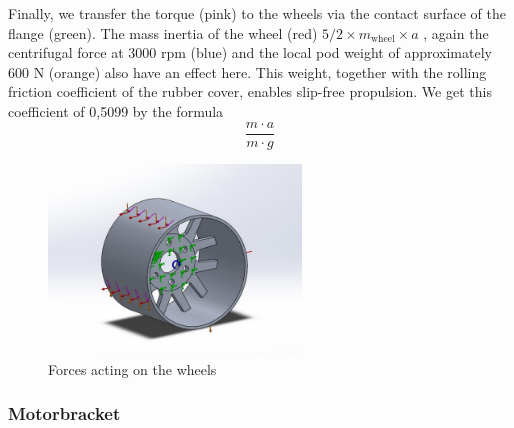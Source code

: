Finally, we transfer the torque (pink) to the wheels via the contact surface of the flange (green). The mass inertia of the wheel (red)
\(5/2 \times m_{\text{wheel}} \times a\)
, again the centrifugal force at 3000 rpm (blue) and the local pod weight of approximately 600 N (orange) also have an effect here. This weight, together with the rolling friction coefficient of the rubber cover, enables slip-free propulsion. We get this coefficient of 0,5099 by the formula
\[
\frac{m \cdot a}{m \cdot g}
\]

\begin{figure}[H]
\centering
\includegraphics[width=0.6\textwidth]{texfiles/mech/eimg/propulsion/picture_forces_wheel}
\caption{Forces acting on the wheels}
\label{fig:wheel_forces}
\end{figure}


\subsubsection{Motorbracket}

